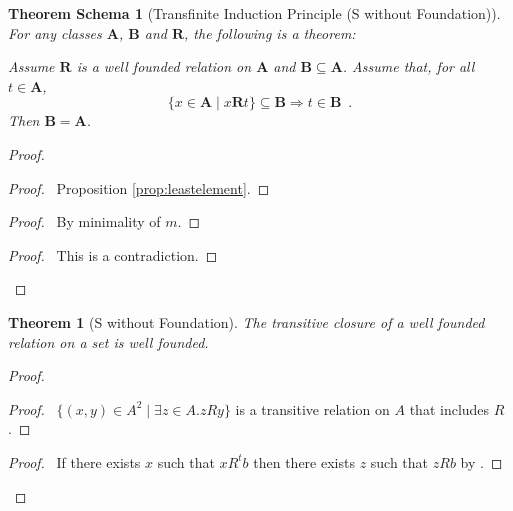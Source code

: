 \documentclass{book}
\let\qed\relax
\newtheorem{thm}[ax]{Theorem}
\newtheorem{thms}[ax]{Theorem Schema}
\theoremstyle{definition}
\begin{document}
\begin{thms}[Transfinite Induction Principle (S without Foundation)]
For any classes $\mathbf{A}$, $\mathbf{B}$ and $\mathbf{R}$, the following is a theorem:

Assume $\mathbf{R}$ is a well founded relation on $\mathbf{A}$ and $\mathbf{B} \subseteq \mathbf{A}$. Assume that, for all $t \in \mathbf{A}$,
\[ \{ x \in \mathbf{A} \mid x \mathbf{R} t \} \subseteq \mathbf{B} \Rightarrow t \in \mathbf{B} \enspace . \]
Then $\mathbf{B} = \mathbf{A}$.
\end{thms}

\begin{proof}
\pf
{}
\begin{proof}
	\pf\ Proposition \ref{prop:leastelement}.
\end{proof}
\begin{proof}
	\pf\ By minimality of $m$.
\end{proof}
\qedstep
\begin{proof}
	\pf\ This is a contradiction.
\end{proof}
\qed
\end{proof}

\begin{thm}[S without Foundation]
The transitive closure of a well founded relation on a set is well founded.
\end{thm}

\begin{proof}
\pf
{}
\begin{proof}
	\pf\ $\{ (x,y) \in A^2 \mid \exists z \in A. zRy \}$ is a transitive relation on $A$ that includes $R$.
\end{proof}
\begin{proof}
	\pf\ If there exists $x$ such that $x R^t b$ then there exists $z$ such that $z R b$ by .
\end{proof}
\qed
\end{proof}
\end{document}
